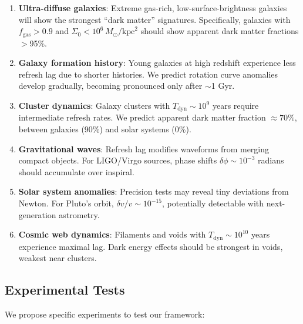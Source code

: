 \documentclass[twocolumn,prd,amsmath,amssymb,aps,superscriptaddress,nofootinbib]{revtex4-2}
\newcommand{\Msun}{M_{\odot}}
\newcommand{\kpc}{\text{kpc}}
\begin{document}
\begin{enumerate}
\item \textbf{Ultra-diffuse galaxies}: Extreme gas-rich, low-surface-brightness galaxies will show the strongest ``dark matter'' signatures. Specifically, galaxies with $f_{\text{gas}} > 0.9$ and $\Sigma_0 < 10^6\,\Msun/\kpc^2$ should show apparent dark matter fractions $>$95\%.

\item \textbf{Galaxy formation history}: Young galaxies at high redshift experience less refresh lag due to shorter histories. We predict rotation curve anomalies develop gradually, becoming pronounced only after $\sim$1 Gyr.

\item \textbf{Cluster dynamics}: Galaxy clusters with $T_{\text{dyn}} \sim 10^9$ years require intermediate refresh rates. We predict apparent dark matter fraction $\approx 70\%$, between galaxies (90\%) and solar systems (0\%).

\item \textbf{Gravitational waves}: Refresh lag modifies waveforms from merging compact objects. For LIGO/Virgo sources, phase shifts $\delta\phi \sim 10^{-3}$ radians should accumulate over inspiral.

\item \textbf{Solar system anomalies}: Precision tests may reveal tiny deviations from Newton. For Pluto's orbit, $\delta v/v \sim 10^{-15}$, potentially detectable with next-generation astrometry.

\item \textbf{Cosmic web dynamics}: Filaments and voids with $T_{\text{dyn}} \sim 10^{10}$ years experience maximal lag. Dark energy effects should be strongest in voids, weakest near clusters.
\end{enumerate}

\subsection{Experimental Tests}

We propose specific experiments to test our framework:
\end{document}
